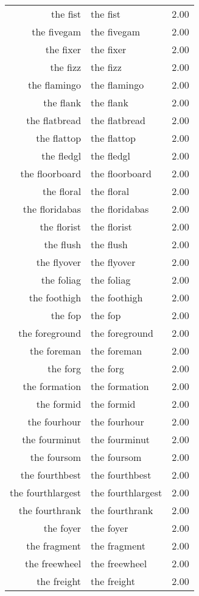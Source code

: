 \begin{table}[ht]
\begin{tabular}{rlr}
  the fist & the fist & 2.00 \\ 
  the fivegam & the fivegam & 2.00 \\ 
  the fixer & the fixer & 2.00 \\ 
  the fizz & the fizz & 2.00 \\ 
  the flamingo & the flamingo & 2.00 \\ 
  the flank & the flank & 2.00 \\ 
  the flatbread & the flatbread & 2.00 \\ 
  the flattop & the flattop & 2.00 \\ 
  the fledgl & the fledgl & 2.00 \\ 
  the floorboard & the floorboard & 2.00 \\ 
  the floral & the floral & 2.00 \\ 
  the floridabas & the floridabas & 2.00 \\ 
  the florist & the florist & 2.00 \\ 
  the flush & the flush & 2.00 \\ 
  the flyover & the flyover & 2.00 \\ 
  the foliag & the foliag & 2.00 \\ 
  the foothigh & the foothigh & 2.00 \\ 
  the fop & the fop & 2.00 \\ 
  the foreground & the foreground & 2.00 \\ 
  the foreman & the foreman & 2.00 \\ 
  the forg & the forg & 2.00 \\ 
  the formation & the formation & 2.00 \\ 
  the formid & the formid & 2.00 \\ 
  the fourhour & the fourhour & 2.00 \\ 
  the fourminut & the fourminut & 2.00 \\ 
  the foursom & the foursom & 2.00 \\ 
  the fourthbest & the fourthbest & 2.00 \\ 
  the fourthlargest & the fourthlargest & 2.00 \\ 
  the fourthrank & the fourthrank & 2.00 \\ 
  the foyer & the foyer & 2.00 \\ 
  the fragment & the fragment & 2.00 \\ 
  the freewheel & the freewheel & 2.00 \\ 
  the freight & the freight & 2.00 \\ 

\end{tabular}
\end{table}
